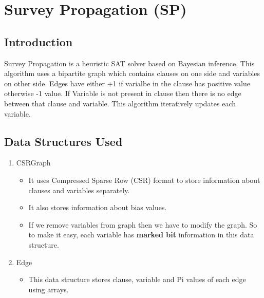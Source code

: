 \documentclass{article}
\begin{document}


\section{Survey Propagation (SP)}

\subsection{Introduction}
Survey Propagation is a heuristic SAT solver based on Bayesian inference. This algorithm uses a bipartite graph which contains clauses on one side and variables on other side. Edges have either +1 if varialbe in the clause has positive value otherwise -1 value. If Variable is not present in clause then there is no edge between that clause and variable. This algorithm iteratively updates each variable. \\


\subsection{Data Structures Used}
\begin{enumerate}
\item CSRGraph 
\begin{itemize}
\item It uses Compressed Sparse Row (CSR) format to store information about clauses and variables separately. 
\item It also stores information about bias values. 
\item If we remove variables from graph then we have to modify the graph. So to make it easy, each variable has \textbf{marked bit} information in this data structure.\\
\end{itemize}
\item Edge
\begin{itemize}
\item This data structure stores clause, variable and Pi values of each edge using arrays.
\end{itemize}
\end{enumerate}

\end{document}
